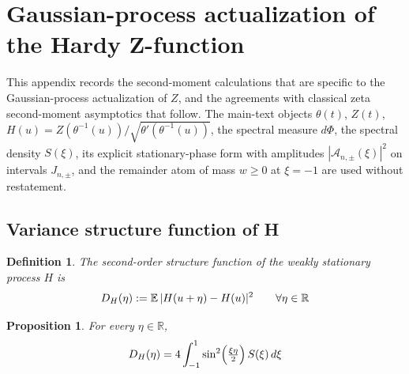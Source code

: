 \documentclass{article}
\newcommand{\assign}{:=}
\newtheorem{definition}{Definition}
\newtheorem{proposition}{Proposition}
\begin{document}
\date{}

\maketitle

\section{Gaussian-process actualization of the Hardy Z-function}\label{app:gp}

This appendix records the second-moment calculations that are specific to the
Gaussian-process actualization of $Z$, and the agreements with classical zeta
second-moment asymptotics that follow. The main-text objects $\theta (t)$, $Z
(t)$, $H (u) = Z (\theta^{- 1} (u)) / \sqrt{\theta' (\theta^{- 1} (u))}$, the
spectral measure $d \Phi$, the spectral density $S (\xi)$, its explicit
stationary-phase form with amplitudes $|\mathcal{A}_{n, \pm} (\xi) |^2$ on
intervals $J_{n, \pm}$, and the remainder atom of mass $w \ge 0$ at $\xi = -
1$ are used without restatement.

\subsection{Variance structure function of H}

\begin{definition}
  \label{def:struct}The second-order structure function of the weakly
  stationary process $H$ is
  \begin{equation}
    D_H (\eta) \assign \mathbb{E} \hspace{0.17em} |H (u + \eta) - H (u) |^2
    \qquad \forall \eta \in \mathbb{R}
  \end{equation}
\end{definition}

\begin{proposition}
  \label{prop:DH-spectral}For every $\eta \in \mathbb{R}$,
  \begin{equation}
    D_H (\eta) = 4 \int_{- 1}^1 \sin^2 \hspace{-0.17em} \left( \tfrac{\xi
    \eta}{2} \right) S (\xi)  \hspace{0.17em} d \xi \label{eq:DH-spectral}
  \end{equation}
\end{proposition}
\end{document}
